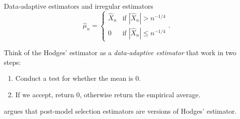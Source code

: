 \documentclass[smaller]{beamer}\usepackage{listings}
\newcommand{\1}{\mathds{1}}
\begin{document}
\begin{frame}[label={sec:orgc120596}]{Data-adaptive estimators and irregular estimators}
\begin{equation*}
  \hat{\mu}_n = 
    \begin{cases}
      \hat{X}_n & \text{if } |\hat{X}_n| > n^{-1/4} \\
      0 & \text{if } |\hat{X}_n| \leq n^{-1/4}
    \end{cases}.
\end{equation*}

\vfill

Think of the Hodges' estimator as a \emph{data-adaptive estimator} that work in two
steps:
\begin{enumerate}
\item Conduct a test for whether the mean is 0.
\item If we accept, return 0, otherwise return the empirical average.
\end{enumerate}

\vfill

\cite{leeb2005model} argues that post-model selection estimators are versions of
Hodges' estimator.
\end{frame}
\end{document}
